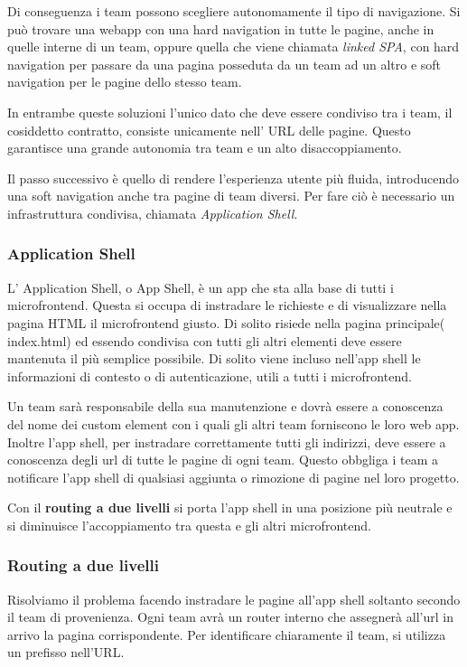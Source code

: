 Di conseguenza i team possono scegliere autonomamente il tipo di navigazione.
Si può trovare una webapp con una hard navigation in tutte le pagine, anche in quelle interne di un team,
oppure quella che viene chiamata \emph{linked SPA}, con hard navigation per passare da una pagina posseduta da un team ad un altro
e soft navigation per le pagine dello stesso team.

In entrambe queste soluzioni l'unico dato che deve essere condiviso tra i team, il cosiddetto contratto, consiste 
unicamente nell' URL delle pagine. Questo garantisce una grande autonomia tra team e un alto disaccoppiamento.

Il passo successivo è quello di rendere l'esperienza utente più fluida, introducendo una soft navigation anche tra pagine di team 
diversi. Per fare ciò è necessario un infrastruttura condivisa, chiamata \emph{Application Shell}.


\subsubsection{Application Shell}
L' Application Shell, o App Shell, è un app che sta alla base di tutti i microfrontend. Questa si occupa di instradare le
richieste e di visualizzare nella pagina HTML il microfrontend giusto. Di solito risiede nella pagina principale( index.html) ed essendo
condivisa con tutti gli altri elementi deve essere mantenuta il più semplice possibile.
Di solito viene incluso nell'app shell le informazioni di contesto o di autenticazione, utili a tutti i microfrontend.

Un team sarà responsabile della sua manutenzione e dovrà essere a conoscenza del nome dei custom element con i quali gli altri team forniscono
le loro web app.
Inoltre l'app shell, per instradare correttamente tutti gli indirizzi, deve essere a conoscenza degli url di tutte le pagine di ogni team.
Questo obbgliga i team a notificare l'app shell di qualsiasi aggiunta o rimozione di pagine nel loro progetto.

Con il \textbf{routing a due livelli} si porta l'app shell in una posizione più neutrale e si diminuisce l'accoppiamento tra questa e gli altri microfrontend.
\subsubsection{Routing a due livelli}
Risolviamo il problema facendo instradare le pagine all'app shell soltanto secondo il team di provenienza.
Ogni team avrà un router interno che assegnerà all'url in arrivo la pagina corrispondente.
Per identificare chiaramente il team, si utilizza un prefisso nell'URL.

